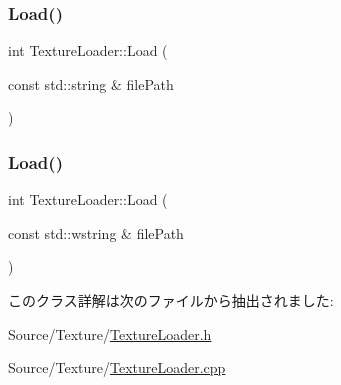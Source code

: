 \subsubsection{\texorpdfstring{Load()}{Load()}\hspace{0.1cm}{\footnotesize\ttfamily [1/2]}}
{\footnotesize\ttfamily int Texture\+Loader\+::\+Load (\begin{DoxyParamCaption}\item[{const std\+::string \&}]{file\+Path }\end{DoxyParamCaption})}

\mbox{\label{class_texture_loader_abf45a1267dfcc7703a7f99ba7069d571}} 
\subsubsection{\texorpdfstring{Load()}{Load()}\hspace{0.1cm}{\footnotesize\ttfamily [2/2]}}
{\footnotesize\ttfamily int Texture\+Loader\+::\+Load (\begin{DoxyParamCaption}\item[{const std\+::wstring \&}]{file\+Path }\end{DoxyParamCaption})}



このクラス詳解は次のファイルから抽出されました\+:\begin{DoxyCompactItemize}
\item 
Source/\+Texture/\mbox{\hyperlink{_texture_loader_8h}{Texture\+Loader.\+h}}\item 
Source/\+Texture/\mbox{\hyperlink{_texture_loader_8cpp}{Texture\+Loader.\+cpp}}\end{DoxyCompactItemize}
